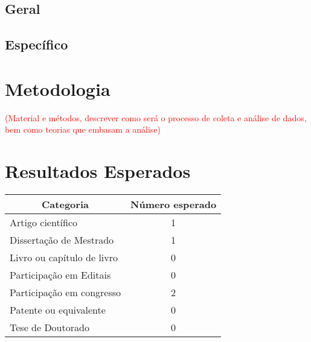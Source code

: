 \documentclass[12pt,a4paper,oneside]{book}
\begin{document}
\section{Geral}
\section{Espec\'{i}fico}
\pagebreak

\chapter{Metodologia}
\textcolor{red}{(Material e m\'{e}todos, descrever como ser\'{a} o processo de coleta e an\'{a}lise de dados, bem como teorias que embasam a an\'{a}lise)}
\pagebreak

\chapter{Resultados Esperados}
\begin{center}
    \begin{tabular}{|l|c|}
        \hline
        \multicolumn{1}{|c|}{Categoria} & \multicolumn{1}{|c|}{N\'{u}mero esperado} \\ \hline
        Artigo cient\'{i}fico & 1 \\ \hline
        Disserta\c{c}\~{a}o de Mestrado & 1 \\ \hline
        Livro ou cap\'{i}tulo de livro & 0 \\ \hline
        Participa\c{c}\~{a}o em Editais & 0 \\ \hline
        Participa\c{c}\~{a}o em congresso & 2 \\ \hline
        Patente ou equivalente & 0 \\ \hline
        Tese de Doutorado & 0 \\ \hline
    \end{tabular}
\end{center}
\pagebreak
\end{document}
